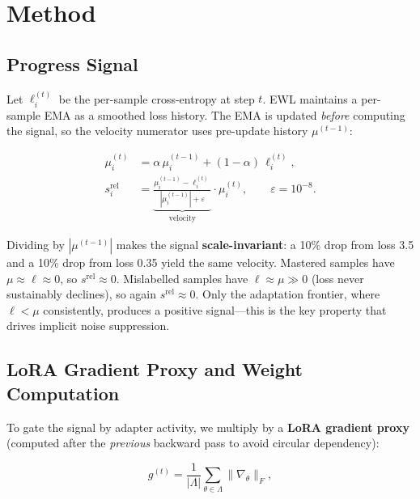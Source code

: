 \section{Method}
\label{sec:method}

\subsection{Progress Signal}

Let $\ell_i^{(t)}$ be the per-sample cross-entropy at step $t$.
EWL maintains a per-sample EMA as a smoothed loss history.
The EMA is updated \emph{before} computing the signal, so the velocity
numerator uses pre-update history $\mu^{(t-1)}$:

{\small
\begin{equation}
\begin{aligned}
  \mu_i^{(t)} &= \alpha\,\mu_i^{(t-1)} + (1-\alpha)\,\ell_i^{(t)}, \\
  s_i^{\text{rel}} &=
  \underbrace{\frac{\mu_i^{(t-1)} - \ell_i^{(t)}}{|\mu_i^{(t-1)}| + \varepsilon}}_{\text{velocity}}
  \cdot \mu_i^{(t)},
  \qquad \varepsilon = 10^{-8}.
\end{aligned}
\label{eq:rel_progress}
\end{equation}
}

Dividing by $|\mu^{(t-1)}|$ makes the signal \textbf{scale-invariant}: a 10\%
drop from loss 3.5 and a 10\% drop from loss 0.35 yield the same velocity.
Mastered samples have $\mu \approx \ell \approx 0$, so $s^{\text{rel}} \approx 0$.
Mislabelled samples have $\ell \approx \mu \gg 0$ (loss never sustainably
declines), so again $s^{\text{rel}} \approx 0$.
Only the adaptation frontier, where $\ell < \mu$ consistently, produces a
positive signal---this is the key property that drives implicit noise
suppression.

\subsection{LoRA Gradient Proxy and Weight Computation}

To gate the signal by adapter activity, we multiply by a \textbf{LoRA gradient
proxy} (computed after the \emph{previous} backward pass to avoid circular
dependency):

{\small
\begin{equation}
  g^{(t)} = \frac{1}{|\Lambda|}\sum_{\theta \in \Lambda} \|\nabla_\theta\|_F,
  \label{eq:grad_proxy}
\end{equation}
}

